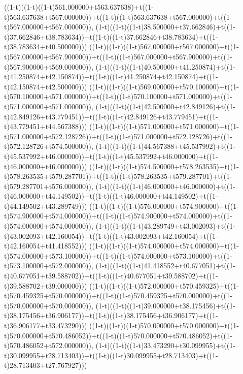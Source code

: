 ((1-t)((1-t)((1-t)561.000000+t563.637638)+t((1-t)563.637638+t567.000000))+t((1-t)((1-t)563.637638+t567.000000)+t((1-t)567.000000+t567.000000)),                                     (1-t)((1-t)((1-t)38.500000+t37.662846)+t((1-t)37.662846+t38.783634))+t((1-t)((1-t)37.662846+t38.783634)+t((1-t)38.783634+t40.500000)))
((1-t)((1-t)((1-t)567.000000+t567.000000)+t((1-t)567.000000+t567.900000))+t((1-t)((1-t)567.000000+t567.900000)+t((1-t)567.900000+t569.000000)),                                     (1-t)((1-t)((1-t)40.500000+t41.250874)+t((1-t)41.250874+t42.150874))+t((1-t)((1-t)41.250874+t42.150874)+t((1-t)42.150874+t42.500000)))
((1-t)((1-t)((1-t)569.000000+t570.100000)+t((1-t)570.100000+t571.000000))+t((1-t)((1-t)570.100000+t571.000000)+t((1-t)571.000000+t571.000000)),                                     (1-t)((1-t)((1-t)42.500000+t42.849126)+t((1-t)42.849126+t43.779451))+t((1-t)((1-t)42.849126+t43.779451)+t((1-t)43.779451+t44.567388)))
((1-t)((1-t)((1-t)571.000000+t571.000000)+t((1-t)571.000000+t572.128726))+t((1-t)((1-t)571.000000+t572.128726)+t((1-t)572.128726+t574.500000)),                                     (1-t)((1-t)((1-t)44.567388+t45.537992)+t((1-t)45.537992+t46.000000))+t((1-t)((1-t)45.537992+t46.000000)+t((1-t)46.000000+t46.000000)))
((1-t)((1-t)((1-t)574.500000+t578.263535)+t((1-t)578.263535+t579.287701))+t((1-t)((1-t)578.263535+t579.287701)+t((1-t)579.287701+t576.000000)),                                     (1-t)((1-t)((1-t)46.000000+t46.000000)+t((1-t)46.000000+t44.149502))+t((1-t)((1-t)46.000000+t44.149502)+t((1-t)44.149502+t43.289749)))
((1-t)((1-t)((1-t)576.000000+t574.900000)+t((1-t)574.900000+t574.000000))+t((1-t)((1-t)574.900000+t574.000000)+t((1-t)574.000000+t574.000000)),                                     (1-t)((1-t)((1-t)43.289749+t43.002093)+t((1-t)43.002093+t42.160054))+t((1-t)((1-t)43.002093+t42.160054)+t((1-t)42.160054+t41.418552)))
((1-t)((1-t)((1-t)574.000000+t574.000000)+t((1-t)574.000000+t573.100000))+t((1-t)((1-t)574.000000+t573.100000)+t((1-t)573.100000+t572.000000)),                                     (1-t)((1-t)((1-t)41.418552+t40.677051)+t((1-t)40.677051+t39.588702))+t((1-t)((1-t)40.677051+t39.588702)+t((1-t)39.588702+t39.000000)))
((1-t)((1-t)((1-t)572.000000+t570.459325)+t((1-t)570.459325+t570.000000))+t((1-t)((1-t)570.459325+t570.000000)+t((1-t)570.000000+t570.000000)),                                     (1-t)((1-t)((1-t)39.000000+t38.175456)+t((1-t)38.175456+t36.906177))+t((1-t)((1-t)38.175456+t36.906177)+t((1-t)36.906177+t33.473290)))
((1-t)((1-t)((1-t)570.000000+t570.000000)+t((1-t)570.000000+t570.486052))+t((1-t)((1-t)570.000000+t570.486052)+t((1-t)570.486052+t572.000000)),                                     (1-t)((1-t)((1-t)33.473290+t30.099955)+t((1-t)30.099955+t28.713403))+t((1-t)((1-t)30.099955+t28.713403)+t((1-t)28.713403+t27.767927)))
